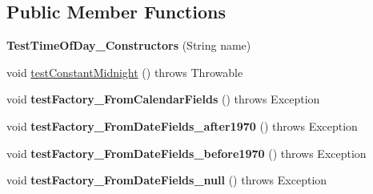 \subsection*{Public Member Functions}
\begin{DoxyCompactItemize}
\item 
\hypertarget{classorg_1_1joda_1_1time_1_1_test_time_of_day___constructors_accfe820bdcd76c7146a6806681ec481f}{{\bfseries Test\-Time\-Of\-Day\-\_\-\-Constructors} (String name)}\label{classorg_1_1joda_1_1time_1_1_test_time_of_day___constructors_accfe820bdcd76c7146a6806681ec481f}

\item 
void \hyperlink{classorg_1_1joda_1_1time_1_1_test_time_of_day___constructors_a185fe469ab056389f76c51921be67029}{test\-Constant\-Midnight} ()  throws Throwable 
\item 
\hypertarget{classorg_1_1joda_1_1time_1_1_test_time_of_day___constructors_a73fb488d468e93fef6e1bcdff8094040}{void {\bfseries test\-Factory\-\_\-\-From\-Calendar\-Fields} ()  throws Exception }\label{classorg_1_1joda_1_1time_1_1_test_time_of_day___constructors_a73fb488d468e93fef6e1bcdff8094040}

\item 
\hypertarget{classorg_1_1joda_1_1time_1_1_test_time_of_day___constructors_ad297245ebef6781ee9058a6479f4f773}{void {\bfseries test\-Factory\-\_\-\-From\-Date\-Fields\-\_\-after1970} ()  throws Exception }\label{classorg_1_1joda_1_1time_1_1_test_time_of_day___constructors_ad297245ebef6781ee9058a6479f4f773}

\item 
\hypertarget{classorg_1_1joda_1_1time_1_1_test_time_of_day___constructors_ac1ca08b511f2802a725ec00ac200d454}{void {\bfseries test\-Factory\-\_\-\-From\-Date\-Fields\-\_\-before1970} ()  throws Exception }\label{classorg_1_1joda_1_1time_1_1_test_time_of_day___constructors_ac1ca08b511f2802a725ec00ac200d454}

\item 
\hypertarget{classorg_1_1joda_1_1time_1_1_test_time_of_day___constructors_a6428f1ccd39ecd6c1cbfdb4c7c1f2aaa}{void {\bfseries test\-Factory\-\_\-\-From\-Date\-Fields\-\_\-null} ()  throws Exception }\label{classorg_1_1joda_1_1time_1_1_test_time_of_day___constructors_a6428f1ccd39ecd6c1cbfdb4c7c1f2aaa}


\end{DoxyCompactItemize}
